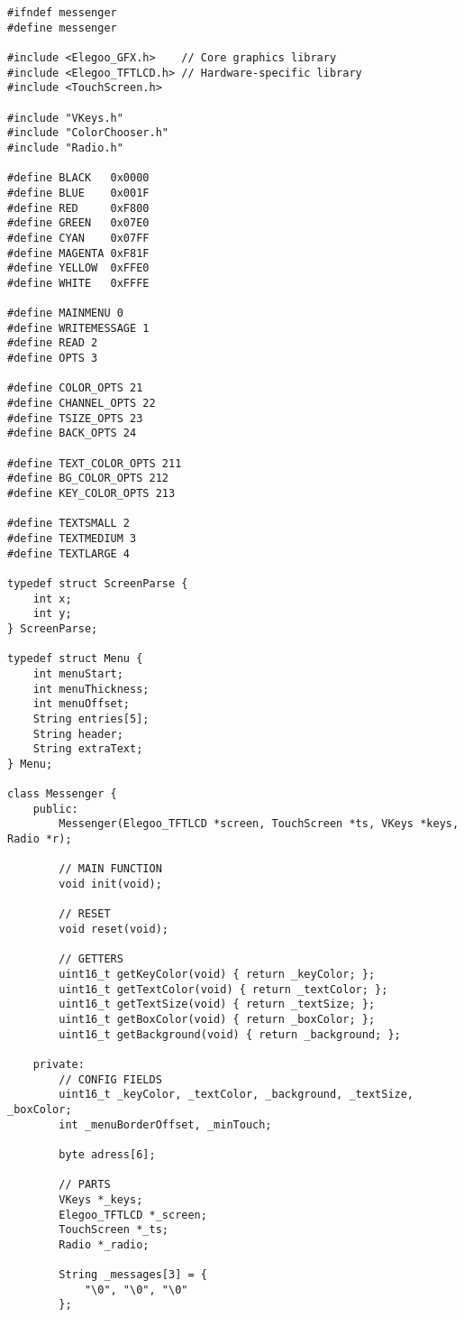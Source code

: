 \documentclass[a4paper, 11pt]{scrartcl}
\begin{document}
\begin{lstlisting}
#ifndef messenger
#define messenger

#include <Elegoo_GFX.h>    // Core graphics library
#include <Elegoo_TFTLCD.h> // Hardware-specific library
#include <TouchScreen.h>

#include "VKeys.h"
#include "ColorChooser.h"
#include "Radio.h"

#define	BLACK   0x0000
#define	BLUE    0x001F
#define	RED     0xF800
#define	GREEN   0x07E0
#define CYAN    0x07FF
#define MAGENTA 0xF81F
#define YELLOW  0xFFE0
#define WHITE   0xFFFE

#define MAINMENU 0
#define WRITEMESSAGE 1
#define READ 2
#define OPTS 3

#define COLOR_OPTS 21
#define CHANNEL_OPTS 22
#define TSIZE_OPTS 23
#define BACK_OPTS 24

#define TEXT_COLOR_OPTS 211
#define BG_COLOR_OPTS 212
#define KEY_COLOR_OPTS 213

#define TEXTSMALL 2
#define TEXTMEDIUM 3
#define TEXTLARGE 4

typedef struct ScreenParse {
    int x;
    int y;
} ScreenParse;

typedef struct Menu {
    int menuStart;
    int menuThickness;
    int menuOffset;
    String entries[5];
    String header;
    String extraText;
} Menu;

class Messenger {
    public:
        Messenger(Elegoo_TFTLCD *screen, TouchScreen *ts, VKeys *keys, Radio *r);

        // MAIN FUNCTION
        void init(void);

        // RESET
        void reset(void);

        // GETTERS
        uint16_t getKeyColor(void) { return _keyColor; };
        uint16_t getTextColor(void) { return _textColor; };
        uint16_t getTextSize(void) { return _textSize; };
        uint16_t getBoxColor(void) { return _boxColor; };
        uint16_t getBackground(void) { return _background; };

    private:
        // CONFIG FIELDS
        uint16_t _keyColor, _textColor, _background, _textSize, _boxColor;
        int _menuBorderOffset, _minTouch;

        byte adress[6];
        
        // PARTS
        VKeys *_keys;
        Elegoo_TFTLCD *_screen;
        TouchScreen *_ts;
        Radio *_radio;

        String _messages[3] = {
            "\0", "\0", "\0"
        };


\end{lstlisting}
\end{document}

